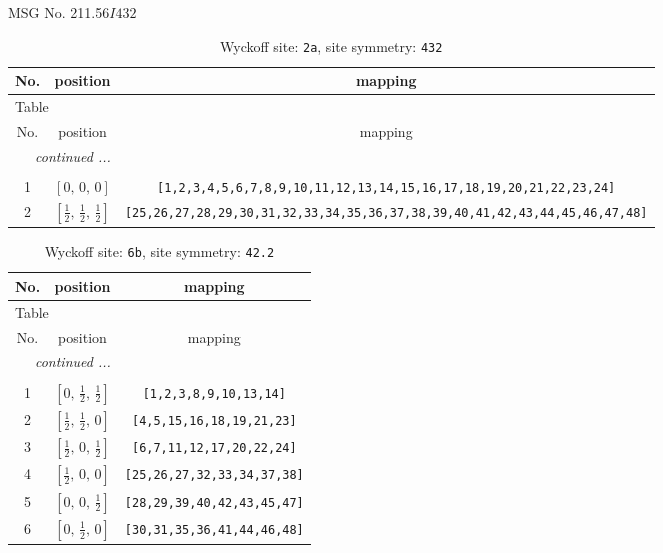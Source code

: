 \documentclass[fleqn,8pt]{jsarticle}
\begin{document}
\setcounter{MaxMatrixCols}{32}

\renewcommand{\tablename}{Table~}
\renewcommand{\figurename}{Figure~}
\begin{center}
\LARGE
MSG No. 211.56\quad$I432$
\end{center}
\renewcommand{\arraystretch}{1.2}
\begin{longtable}{ccc}
\caption{Wyckoff site: {\tt 2a}, site symmetry: {\tt 432}}
 \\
 \hline \hline
No. & position & mapping \\ \hline \endfirsthead

\multicolumn{2}{l}{\tablename\ \thetable{}} \\
 \hline \hline
No. & position & mapping \\ \hline \endhead

 \hline \hline
\multicolumn{2}{r}{\footnotesize\it continued ...} \\ \endfoot

 \hline \hline
\multicolumn{2}{r}{} \\ \endlastfoot

1 & $\left[ 0,\, 0,\, 0 \right]$ & {\tt [1,2,3,4,5,6,7,8,9,10,11,12,13,14,15,16,17,18,19,20,21,22,23,24]} \\ \hline
2 & $\left[ \frac{1}{2},\, \frac{1}{2},\, \frac{1}{2} \right]$ & {\tt [25,26,27,28,29,30,31,32,33,34,35,36,37,38,39,40,41,42,43,44,45,46,47,48]} \\
\end{longtable}
\renewcommand{\arraystretch}{1.2}
\begin{longtable}{ccc}
\caption{Wyckoff site: {\tt 6b}, site symmetry: {\tt 42.2}}
 \\
 \hline \hline
No. & position & mapping \\ \hline \endfirsthead

\multicolumn{2}{l}{\tablename\ \thetable{}} \\
 \hline \hline
No. & position & mapping \\ \hline \endhead

 \hline \hline
\multicolumn{2}{r}{\footnotesize\it continued ...} \\ \endfoot

 \hline \hline
\multicolumn{2}{r}{} \\ \endlastfoot

1 & $\left[ 0,\, \frac{1}{2},\, \frac{1}{2} \right]$ & {\tt [1,2,3,8,9,10,13,14]} \\ \hline
2 & $\left[ \frac{1}{2},\, \frac{1}{2},\, 0 \right]$ & {\tt [4,5,15,16,18,19,21,23]} \\ \hline
3 & $\left[ \frac{1}{2},\, 0,\, \frac{1}{2} \right]$ & {\tt [6,7,11,12,17,20,22,24]} \\ \hline
4 & $\left[ \frac{1}{2},\, 0,\, 0 \right]$ & {\tt [25,26,27,32,33,34,37,38]} \\ \hline
5 & $\left[ 0,\, 0,\, \frac{1}{2} \right]$ & {\tt [28,29,39,40,42,43,45,47]} \\ \hline
6 & $\left[ 0,\, \frac{1}{2},\, 0 \right]$ & {\tt [30,31,35,36,41,44,46,48]} \\
\end{longtable}
\end{document}
